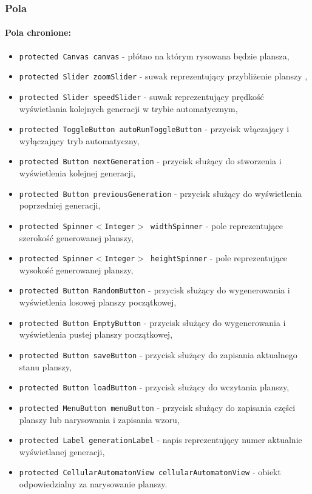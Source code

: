\documentclass{report}
\begin{document}
\subsubsection{Pola}
\paragraph{Pola chronione:}
\begin{itemize}
	\item \texttt{protected Canvas canvas} - płótno na którym rysowana będzie plansza,
	\item \texttt{protected Slider zoomSlider} - suwak reprezentujący przybliżenie planszy \label{sec:zoomSlider},
	\item \texttt{protected Slider speedSlider} - suwak reprezentujący prędkość wyświetlania kolejnych generacji w trybie automatycznym\label{sec:speedSlider},
	\item \texttt{protected ToggleButton autoRunToggleButton} - przycisk włączający i wyłączający tryb automatyczny,
	\item \texttt{protected Button nextGeneration} - przycisk służący do stworzenia i wyświetlenia kolejnej generacji,
	\item \texttt{protected Button previousGeneration}  - przycisk służący do  wyświetlenia poprzedniej generacji,
	\item \texttt{protected Spinner$<$Integer$>$  widthSpinner} - pole reprezentujące szerokość generowanej planszy,
	\item \texttt{protected Spinner$<$Integer$>$ heightSpinner} - pole reprezentujące wysokość generowanej planszy,
	\item \texttt{protected Button RandomButton} - przycisk służący do wygenerowania i wyświetlenia losowej planszy początkowej,
	\item \texttt{protected Button EmptyButton} - przycisk służący do wygenerowania i wyświetlenia pustej planszy początkowej,
	\item \texttt{protected Button saveButton} - przycisk służący do zapisania aktualnego stanu planszy,
	\item \texttt{protected Button loadButton} - przycisk służący do wczytania planszy,
	\item \texttt{protected MenuButton menuButton} - przycisk służący do zapisania części planszy lub narysowania i zapisania wzoru,
	\item \texttt{protected Label generationLabel} -  napis reprezentujący numer aktualnie wyświetlanej generacji,
	\item \texttt{protected CellularAutomatonView cellularAutomatonView} - obiekt odpowiedzialny za narysowanie planszy.
\end{itemize}
\end{document}
